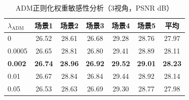 \begin{table}[htbp]
    \centering
    \caption{ADM正则化权重敏感性分析（3视角，PSNR dB）}
    \label{tab:spags_adm_hyper}
    \begin{tabular}{lcccccc}
        \toprule
        $\lambda_{\text{ADM}}$ & 场景1 & 场景2 & 场景3 & 场景4 & 场景5 & 平均 \\
        \midrule
        0 & 26.52 & 28.61 & 26.68 & 29.28 & 28.76 & 27.97 \\
        0.0005 & 26.65 & 28.81 & 26.80 & 29.41 & 28.89 & 28.11 \\
        \textbf{0.002} & \textbf{26.74} & \textbf{28.96} & \textbf{26.92} & \textbf{29.52} & \textbf{29.01} & \textbf{28.23} \\
        0.01 & 26.67 & 28.84 & 26.84 & 29.44 & 28.92 & 28.14 \\
        0.05 & 26.53 & 28.63 & 26.69 & 29.30 & 28.77 & 27.98 \\
        \bottomrule
    \end{tabular}
\end{table}
